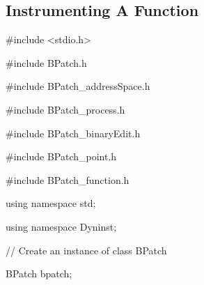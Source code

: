 \subsection{Instrumenting A Function}

{

\#include <stdio.h>}





\bigskip



{

\#include {\textquotedbl}BPatch.h{\textquotedbl}}



{

\#include {\textquotedbl}BPatch_addressSpace.h{\textquotedbl}}



{

\#include {\textquotedbl}BPatch_process.h{\textquotedbl}}



{

\#include {\textquotedbl}BPatch_binaryEdit.h{\textquotedbl}}



{

\#include {\textquotedbl}BPatch_point.h{\textquotedbl}}



{

\#include {\textquotedbl}BPatch_function.h{\textquotedbl}}





\bigskip



{

using namespace std;}



{

using namespace Dyninst;}





\bigskip



{

// Create an instance of class BPatch}



{

BPatch bpatch;}





\bigskip



